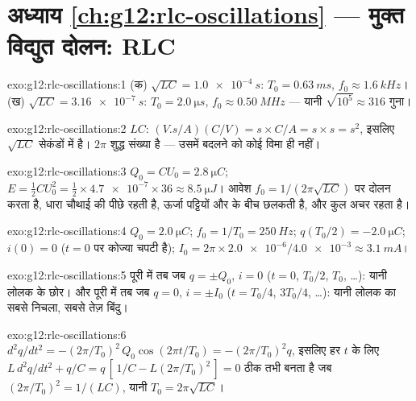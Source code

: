 \section*{अध्याय \ref{ch:g12:rlc-oscillations} --- मुक्त विद्युत दोलन: RLC}

\begin{solution}{exo:g12:rlc-oscillations:1}
(क) $\sqrt{LC} = \qty{1.0e-4}{s}$: $T_0 = \qty{0.63}{ms}$, $f_0 \approx \qty{1.6}{kHz}$। (ख) $\sqrt{LC} = \qty{3.16e-7}{s}$: $T_0 = \qty{2.0}{\micro s}$, $f_0 \approx \qty{0.50}{MHz}$ --- यानी $\sqrt{10^5} \approx 316$ गुना।
\end{solution}

\begin{solution}{exo:g12:rlc-oscillations:2}
$LC$: $(\unit{V.s/A})(\unit{C/V}) = \unit{s} \times \unit{C/A} =
\unit{s} \times \unit{s} = \unit{s^2}$, इसलिए $\sqrt{LC}$ सेकंडों में है। $2\pi$ शुद्ध संख्या है --- उसमें
बदलने को कोई विमा ही नहीं।
\end{solution}

\begin{solution}{exo:g12:rlc-oscillations:3}
$Q_0 = CU_0 = \qty{2.8}{\micro C}$; $E = \tfrac12 CU_0^2 =
\tfrac12 \times \num{4.7e-7} \times 36 \approx \qty{8.5}{\micro J}$। आवेश $f_0 = 1/(2\pi\sqrt{LC})$ पर दोलन करता है, धारा चौथाई  की
 पीछे रहती है, ऊर्जा पट्टियों और  के बीच
छलकती है, और कुल अचर रहता है।
\end{solution}

\begin{solution}{exo:g12:rlc-oscillations:4}
$Q_0 = \qty{2.0}{\micro C}$; $f_0 = 1/T_0 = \qty{250}{Hz}$; $q(T_0/2) = \qty{-2.0}{\micro C}$; $i(0) = 0$ ($t=0$ पर कोज्या चपटी है); $I_0 = 2\pi \times \num{2.0e-6}/\num{4.0e-3} \approx \qty{3.1}{mA}$।
\end{solution}

\begin{solution}{exo:g12:rlc-oscillations:5}
पूरी  में तब जब $q = \pm Q_0$, $i = 0$ ($t = 0$, $T_0/2$, $T_0$,
\dots): यानी लोलक के छोर। और पूरी  में तब जब $q = 0$, $i = \pm I_0$
($t = T_0/4$, $3T_0/4$, \dots): यानी लोलक का सबसे निचला, सबसे तेज़ बिंदु।
\end{solution}

\begin{solution}{exo:g12:rlc-oscillations:6}
$d^2q/dt^2 = -(2\pi/T_0)^2\,Q_0\cos(2\pi t/T_0) = -(2\pi/T_0)^2 q$, इसलिए हर $t$ के लिए $L\,d^2q/dt^2 + q/C = q\,[\,1/C - L(2\pi/T_0)^2\,] = 0$ ठीक तभी बनता है जब $(2\pi/T_0)^2 = 1/(LC)$, यानी $T_0 = 2\pi\sqrt{LC}$।
\end{solution}

